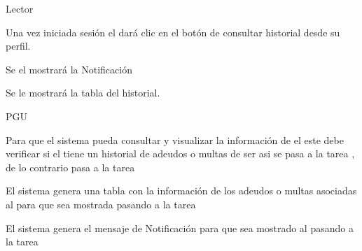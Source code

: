 \begin{PDescripcion}

  \Ppaso Lector 

    \begin{enumerate}

      \Ppaso[\itarea]  Una vez iniciada sesión el  dará clic en el botón de consultar historial desde su perfil.
      
            \Ppaso[\itarea]  Se el mostrará la Notificación  
            
            \Ppaso[\itarea]  Se le mostrará la tabla del historial.              
            
    \end{enumerate}

  \Ppaso PGU
    \begin{enumerate}

      \Ppaso[\itarea]  Para que el sistema pueda consultar y visualizar la información de el  este debe verificar si el      tiene un historial de adeudos o multas de ser asi se pasa a la tarea , de lo contrario pasa a la tarea 

      \Ppaso[\itarea]  El sistema genera una tabla con la información de los adeudos o multas asociadas al  para que sea mostrada pasando a la tarea 

      \Ppaso[\itarea]  El sistema genera el mensaje de Notificación  para que sea mostrado al  pasando a la tarea 

      
    \end{enumerate}

\end{PDescripcion}
